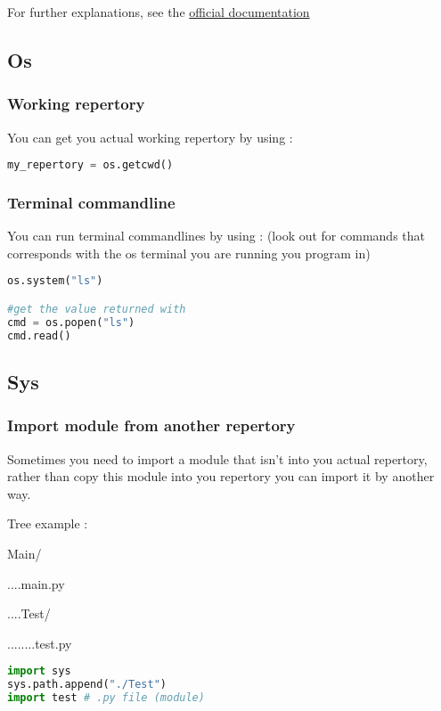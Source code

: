 \documentclass[a4paper, 12pt, titlepage]{scrartcl} %
\begin{document}
\vspace{5mm}

For further explanations, see the \href{https://docs.python.org/3/library/hashlib.html}{official documentation}


\subsection{Os}
\subsubsection{Working repertory}
You can get you actual working repertory by using :
\begin{lstlisting}[language=Python]
my_repertory = os.getcwd()
\end{lstlisting} \vspace{5mm}

\subsubsection{Terminal commandline}
You can run terminal commandlines by using : (look out for commands that corresponds with the os terminal you are running you program in)
\begin{lstlisting}[language=Python]
os.system("ls")

#get the value returned with
cmd = os.popen("ls")
cmd.read()
\end{lstlisting} \vspace{5mm}

\subsection{Sys}
\subsubsection{Import module from another repertory}
Sometimes you need to import a module that isn't into you actual repertory, rather than copy this module into you repertory you can import it by another way. 

\vspace{5mm}

Tree example : 

Main/ 

....main.py 

....Test/ 

........test.py 

\begin{lstlisting}[language=Python]
import sys
sys.path.append("./Test")
import test # .py file (module)
\end{lstlisting} \vspace{5mm}
\end{document}
